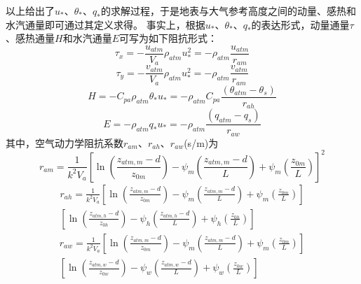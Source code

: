 以上给出了$u_\ast$、$\theta_\ast$、$q_\ast$的求解过程，于是地表与大气参考高度之间的动量、感热和水汽通量即可通过其定义求得。
事实上，根据$u_\ast$、$\theta_\ast$、$q_\ast$的表达形式，动量通量$\tau$、感热通量$H$和水汽通量$E$可写为如下阻抗形式：
\begin{equation}
\tau_{x}=-\frac{u_{atm}}{V_{a}} \rho_{atm} u_{*}^{2}=-\rho_{atm} \frac{u_{atm}}{r_{a m}}
\end{equation}
\begin{equation}
\tau_{y}=-\frac{v_{atm}}{V_{a}} \rho_{atm} u_{*}^{2}=-\rho_{atm} \frac{v_{atm}}{r_{a m}}
\end{equation}
\begin{equation}
H=-C_{p a} \rho_{atm} \theta_{*} u_{*}=-\rho_{atm} C_{p a} \frac{\left(\theta_{atm}-\theta_{s}\right)}{r_{a h}}
\end{equation}
\begin{equation}
E=-\rho_{atm} q_{*} u_{*}=-\rho_{atm} \frac{\left(q_{atm}-q_{s}\right)}{r_{a w}}
\end{equation}
其中，空气动力学阻抗系数$r_{am}$、$r_{ah}$、$r_{aw}$(s/m)为
\begin{equation}\label{ram}
r_{a m}=\frac{1}{k^{2} V_{a}}\left[\ln \left(\frac{z_{atm, m}-d}{z_{0 m}}\right)-\psi_{m}\left(\frac{z_{atm, m}-d}{L}\right)+\psi_{m}\left(\frac{z_{0 m}}{L}\right)\right]^{2}
\end{equation}
\begin{equation}\label{rah}
\begin{array}{c}r_{a h}=\frac{1}{k^{2} V_{a}}\left[\ln \left(\frac{z_{atm, m}-d}{z_{0 m}}\right)-\psi_{m}\left(\frac{z_{atm, m}-d}{L}\right)+\psi_{m}\left(\frac{z_{0 m}}{L}\right)\right] \\ {\left[\ln \left(\frac{z_{atm, h}-d}{z_{0 h}}\right)-\psi_{h}\left(\frac{z_{atm, h}-d}{L}\right)+\psi_{h}\left(\frac{z_{0 h}}{L}\right)\right]}\end{array}
\end{equation}
\begin{equation}\label{raw}
\begin{array}{c}r_{a w}=\frac{1}{k^{2} V_{a}}\left[\ln \left(\frac{z_{atm, m}-d}{z_{0 m}}\right)-\psi_{m}\left(\frac{z_{atm, m}-d}{L}\right)+\psi_{m}\left(\frac{z_{0 m}}{L}\right)\right] \\ {\left[\ln \left(\frac{z_{atm, w}-d}{z_{0 w}}\right)-\psi_{w}\left(\frac{z_{atm, w}-d}{L}\right)+\psi_{w}\left(\frac{z_{0 w}}{L}\right)\right]}\end{array}
\end{equation}

